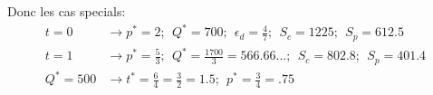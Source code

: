 \documentclass[12pt]{report}
\numberwithin{equation}{section}
\begin{document}
Donc les cas specials:
\begin{align*}
t = 0 &\rightarrow p^* = 2; ~~ Q^*= 700;  ~~ \epsilon_d = \frac{4}{7};  ~~S_c = 1225; ~~ S_p = 612.5\\
t = 1 &\rightarrow p^* = \frac{5}{3}; ~~ Q^*= \frac{1700}{3}= 566.66...;  ~~ S_c = 802.8;  ~~  S_p = 401.4 \\
Q^*= 500 &\rightarrow  t^*= \frac{6}{4}=\frac{3}{2}=1.5; ~~ p^* = \frac{3}{4}=.75\\
\end{align*}








\end{document}
